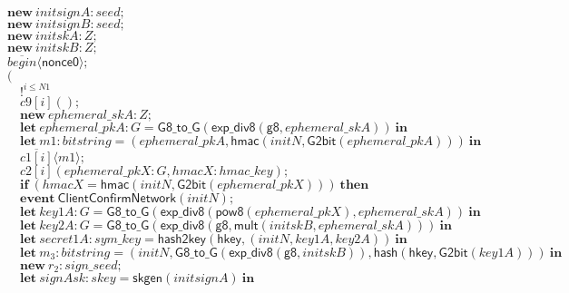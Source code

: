 \documentclass{article}
\newcommand{\cinput}[2]{{#1}({#2})}
\newcommand{\coutput}[2]{\overline{#1}\langle{#2}\rangle}
\newcommand{\kw}[1]{\mathbf{#1}}
\newcommand{\kwf}[1]{\mathsf{#1}}
\newcommand{\var}[1]{\mathit{#1}}
\newcommand{\kwt}[1]{\mathit{#1}}
\newcommand{\kwp}[1]{\mathit{#1}}
\newcommand{\kwc}[1]{\mathit{#1}}
\begin{document}
\begin{tabbing}
\>$\kw{new}\ \var{initsignA}: \kwt{seed};$\\
\>$\kw{new}\ \var{initsignB}: \kwt{seed};$\\
\>$\kw{new}\ \var{initskA}: \kwt{Z};$\\
\>$\kw{new}\ \var{initskB}: \kwt{Z};$\\
\>$\coutput{\kwc{begin}}{\kwf{nonce0}};$\\
\>$($\\
\>$\quad !^{\var{i} \leq \kwp{N1}}$\\
\>$\quad \cinput{\kwc{c9}[\var{i}]}{};$\\
\>$\quad \kw{new}\ \var{ephemeral{\_}skA}: \kwt{Z};$\\
\>$\quad \kw{let}\ \var{ephemeral{\_}pkA}: \kwt{G} = \kwf{G8{\_}to{\_}G}(\kwf{exp{\_}div8}(\kwf{g8}, \var{ephemeral{\_}skA}))\ \kw{in}$\\
\>$\quad \kw{let}\ \var{m1}: \kwt{bitstring} = \kwf{}(\var{ephemeral{\_}pkA}, \kwf{hmac}(\var{initN}, \kwf{G2bit}(\var{ephemeral{\_}pkA})))\ \kw{in}$\\
\>$\quad \coutput{\kwc{c1}[\var{i}]}{\var{m1}};$\\
\>$\quad \cinput{\kwc{c2}[\var{i}]}{\var{ephemeral{\_}pkX}: \kwt{G}, \var{hmacX}: \kwt{hmac{\_}key}};$\\
\>$\quad \kw{if}\ (\var{hmacX}  =  \kwf{hmac}(\var{initN}, \kwf{G2bit}(\var{ephemeral{\_}pkX})))\ \kw{then}$\\
\>$\quad \kw{event}\ \kwf{ClientConfirmNetwork}(\var{initN});$\\
\>$\quad \kw{let}\ \var{key1A}: \kwt{G} = \kwf{G8{\_}to{\_}G}(\kwf{exp{\_}div8}(\kwf{pow8}(\var{ephemeral{\_}pkX}), \var{ephemeral{\_}skA}))\ \kw{in}$\\
\>$\quad \kw{let}\ \var{key2A}: \kwt{G} = \kwf{G8{\_}to{\_}G}(\kwf{exp{\_}div8}(\kwf{g8}, \kwf{mult}(\var{initskB}, \var{ephemeral{\_}skA})))\ \kw{in}$\\
\>$\quad \kw{let}\ \var{secret1A}: \kwt{sym{\_}key} = \kwf{hash2key}(\kwf{hkey}, \kwf{}(\var{initN}, \var{key1A}, \var{key2A}))\ \kw{in}$\\
\>$\quad \kw{let}\ \var{m}_{3}: \kwt{bitstring} = \kwf{}(\var{initN}, \kwf{G8{\_}to{\_}G}(\kwf{exp{\_}div8}(\kwf{g8}, \var{initskB})), \kwf{hash}(\kwf{hkey}, \kwf{G2bit}(\var{key1A})))\ \kw{in}$\\
\>$\quad \kw{new}\ \var{r}_{2}: \kwt{sign{\_}seed};$\\
\>$\quad \kw{let}\ \var{signAsk}: \kwt{skey} = \kwf{skgen}(\var{initsignA})\ \kw{in}$\\

\end{tabbing}
\end{document}
